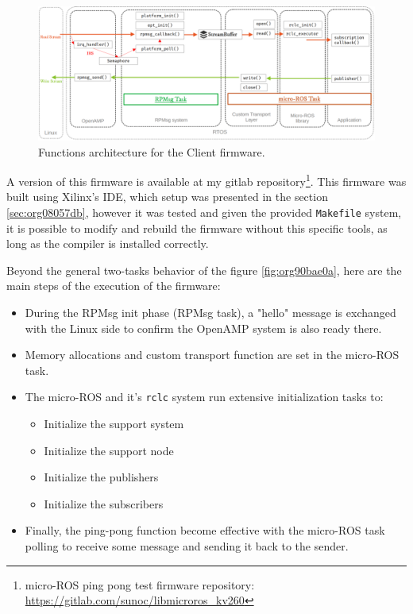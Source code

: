 \documentclass[10pt]{article}
\begin{document}
\begin{figure}[htbp]
\centering
\includegraphics[width=.9\textwidth]{./img/client_arch.png}
\caption{\label{fig:org711c664}Functions architecture for the Client firmware.}
\end{figure}

A version of this firmware is available at my gitlab repository\footnote{micro-ROS ping pong test firmware repository: \url{https://gitlab.com/sunoc/libmicroros\_kv260}}. This firmware was built using
Xilinx's IDE, which setup was presented in the section \ref{sec:org08057db}, however it was tested
and given the provided \texttt{Makefile} system, it is possible to modify and rebuild the firmware
without this specific tools, as long as the compiler is installed correctly.

Beyond the general two-tasks behavior of the figure \ref{fig:org90bae0a}, here are the main steps
of the execution of the firmware:
\begin{itemize}
\item During the RPMsg init phase (RPMsg task), a "hello" message is exchanged with the Linux side
to confirm the OpenAMP system is also ready there.
\item Memory allocations and custom transport function are set in the micro-ROS task.
\item The micro-ROS and it's \texttt{rclc} system run extensive initialization tasks to:
\begin{itemize}
\item Initialize the support system
\item Initialize the support node
\item Initialize the publishers
\item Initialize the subscribers
\end{itemize}
\item Finally, the ping-pong function become effective with the micro-ROS task
polling to receive some message and sending it back to the sender.
\end{itemize}
\end{document}
